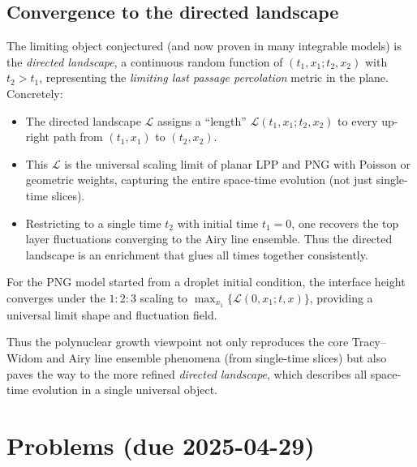 \documentclass[letterpaper,11pt,oneside,reqno]{article}
\numberwithin{equation}{section}
\theoremstyle{definition}
\begin{document}
\subsection{Convergence to the directed landscape}
\label{sub:PNG-directed-landscape}
The limiting object conjectured (and now proven in many integrable models) is the \emph{directed landscape}, a continuous random function of $(t_1,x_1;t_2,x_2)$ with $t_2>t_1$, representing the \emph{limiting last passage percolation} metric in the plane. Concretely:
\begin{itemize}
\item The directed landscape $\mathcal{L}$ assigns a “length” $\mathcal{L}(t_1,x_1;t_2,x_2)$ to every up-right path from $(t_1,x_1)$ to $(t_2,x_2)$.
\item This $\mathcal{L}$ is the universal scaling limit of planar LPP and PNG with Poisson or geometric weights, capturing the entire space-time evolution (not just single-time slices).
\item Restricting to a single time $t_2$ with initial time $t_1=0$, one recovers the top layer fluctuations converging to the Airy line ensemble. Thus the directed landscape is an enrichment that glues all times together consistently.
\end{itemize}
For the PNG model started from a droplet initial condition, the interface height converges under the $1:2:3$ scaling to $\max_{x_1}\{\mathcal{L}(0,x_1;t,x)\}$, providing a universal limit shape and fluctuation field.

\medskip
Thus the polynuclear growth viewpoint not only reproduces the core Tracy--Widom and Airy line ensemble phenomena (from single-time slices) but also paves the way to the more refined \emph{directed landscape}, which describes all space-time evolution in a single universal object.





















\appendix
\setcounter{section}{11}

\section{Problems (due 2025-04-29)}
\end{document}
